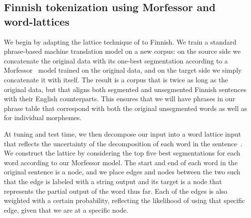 
\subsection{Finnish tokenization using Morfessor and word-lattices}
\label{sec:fien1}

%


We begin by adapting the lattice technique of  to Finnish. 
%
We train a standard phrase-based machine translation model on a new corpus: 
%
on the source side we concatenate the original data with its one-best segmentation according to a Morfessor~\cite{creutz} model trained on the original data, and on the target side we simply concatenate it with itself. 
%
The result is a corpus that is twice as long as the original data, but that aligns both segmented and unsegmented Finnish sentences with their English counterparts.
%
This ensures that we will have phrases in our phrase table that correspond with both the original unsegmented words as well as for individual morphemes.

At tuning and test time, we then decompose our input into a word lattice input that reflects the uncertainty of the decomposition of each word in the sentence~\cite{Dyer:2008:ACL-HLT}.
%
We construct the lattice by considering the top five best segmentations for each word according to our Morfessor model.
%
The start and end of each word in the original sentence is a node, and we place edges and nodes between the two such that the edge is labeled with a string output and its target is a node that represents the partial output of the word thus far.
%
Each of the edges is also weighted with a certain probability, reflecting the likelihood of using that specific edge, given that we are at a specific node. 

